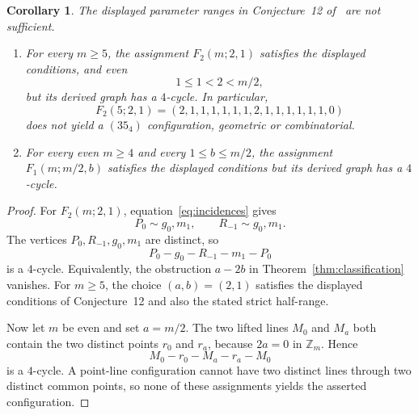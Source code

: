 \documentclass[11pt]{amsart}
\newtheorem{corollary}[theorem]{Corollary}
\theoremstyle{remark}
\newcommand{\Z}{\mathbb Z}
\begin{document}
\begin{corollary}\label{cor:counterexamples}
The displayed parameter ranges in Conjecture~12 of~\cite{BGP} are not
sufficient.
\begin{enumerate}
\item
For every $m\ge5$, the assignment $F_2(m;2,1)$ satisfies the displayed
conditions, and even
\[
1\le1<2<m/2,
\]
but its derived graph has a $4$-cycle. In particular,
\[
F_2(5;2,1)
=(2,1,1,1,1,1,1,2,1,1,1,1,1,1,0)
\]
does not yield a $(35_4)$ configuration, geometric or combinatorial.
\item
For every even $m\ge4$ and every $1\le b\le m/2$, the assignment
$F_1(m;m/2,b)$ satisfies the displayed conditions but its derived graph
has a $4$-cycle.
\end{enumerate}
\end{corollary}

\begin{proof}
For $F_2(m;2,1)$, equation~\eqref{eq:incidences} gives
\[
P_0\sim g_0,m_1,
\qquad
R_{-1}\sim g_0,m_1.
\]
The vertices $P_0,R_{-1},g_0,m_1$ are distinct, so
\[
P_0-g_0-R_{-1}-m_1-P_0
\]
is a $4$-cycle. Equivalently, the obstruction $a-2b$ in
Theorem~\ref{thm:classification} vanishes. For $m\ge5$, the choice
$(a,b)=(2,1)$ satisfies the displayed conditions of Conjecture~12 and also
the stated strict half-range.

Now let $m$ be even and set $a=m/2$. The two lifted lines $M_0$ and $M_a$
both contain the two distinct points $r_0$ and $r_a$, because $2a=0$ in
$\Z_m$. Hence
\[
M_0-r_0-M_a-r_a-M_0
\]
is a $4$-cycle. A point-line configuration cannot have two distinct lines
through two distinct common points, so none of these assignments yields the
asserted configuration.
\end{proof}
\end{document}
